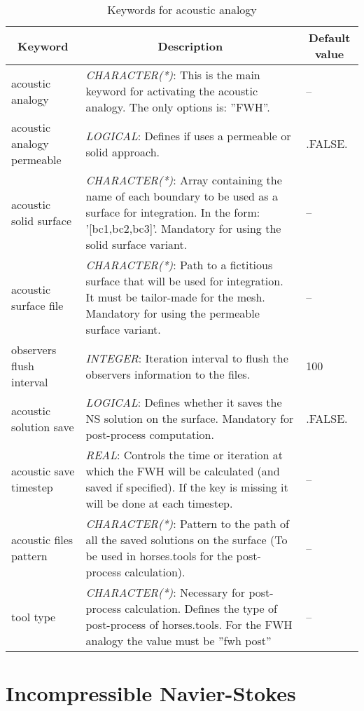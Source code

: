 \documentclass[a4paper,10pt]{report}
\begin{document}
\begin{table}[htbp]
\caption{Keywords for acoustic analogy}
\begin{tabular}{|l|p{10cm}|p{2.2cm}|}
\hline
\multicolumn{1}{|c|}{Keyword} & \multicolumn{1}{c|}{Description} & \multicolumn{1}{c|}{Default value} \\ \hline

acoustic analogy                & \textit{CHARACTER(*)}: This is the main keyword for activating the acoustic analogy. The only options is: ''FWH''. & -- \\ \hline
acoustic analogy permeable      & \textit{LOGICAL}: Defines if uses a permeable or solid approach.  & .FALSE. \\ \hline
acoustic solid surface          & \textit{CHARACTER(*)}: Array containing the name of each boundary to be used as a surface for integration. In the form: '[bc1,bc2,bc3]'. Mandatory for using the solid surface variant. & -- \\ \hline
acoustic surface file           & \textit{CHARACTER(*)}: Path to a fictitious surface that will be used for integration. It must be tailor-made for the mesh. Mandatory for using the permeable surface variant. & -- \\ \hline
observers flush interval        & \textit{INTEGER}: Iteration interval to flush the observers information to the files. & 100 \\ \hline
acoustic solution save          & \textit{LOGICAL}: Defines whether it saves the NS solution on the surface. Mandatory for post-process computation. & .FALSE. \\ \hline
acoustic save timestep 	        & \textit{REAL}: Controls the time or iteration at which the FWH will be calculated (and saved if specified). If the key is missing it will be done at each timestep.  & -- \\ \hline
acoustic files pattern          & \textit{CHARACTER(*)}: Pattern to the path of all the saved solutions on the surface (To be used in horses.tools for the post-process calculation). & -- \\ \hline
tool type                       & \textit{CHARACTER(*)}: Necessary for post-process calculation. Defines the type of post-process of horses.tools. For the FWH analogy the value must be ''fwh post'' & -- \\ \hline
\end{tabular}
\label{tab:FWHKey}
\end{table}


\section{Incompressible Navier-Stokes}
\end{document}
